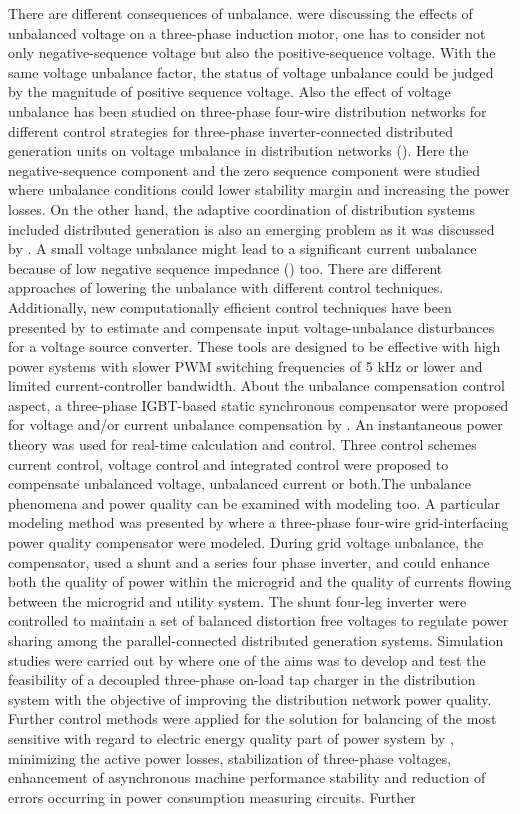    There are different consequences of unbalance. \cite{lee1998effects} were discussing the effects of unbalanced voltage on a three-phase induction motor, one has to consider not only negative-sequence voltage but also the positive-sequence voltage. With the same voltage unbalance factor, the status of voltage unbalance could be judged by the magnitude of positive sequence voltage. Also the effect of voltage unbalance has been studied on three-phase four-wire distribution networks for different control strategies for three-phase inverter-connected distributed generation units on voltage unbalance in distribution networks (\cite{meersman2011three}). Here the negative-sequence component and the zero sequence component were studied where unbalance conditions could lower stability margin and increasing the power losses. On the other hand, the adaptive coordination of distribution systems included distributed generation is also an emerging problem as it was discussed by \cite{ates2016}.  A small voltage unbalance might lead to a significant current unbalance because of low negative sequence impedance (\cite{bina2011three}) too. There are different approaches of lowering the unbalance with different control techniques. Additionally, new computationally efficient control techniques have been presented by \cite{lee2010new} to estimate and compensate input voltage-unbalance disturbances for a voltage source converter. These tools are designed to be effective with high power systems with slower PWM switching frequencies of 5 kHz or lower and limited current-controller bandwidth. About the unbalance compensation control aspect, a three-phase IGBT-based static synchronous compensator were proposed for voltage and/or current unbalance compensation by \cite{xu2010voltage}. An instantaneous power theory was used for real-time calculation and control. Three control schemes current control, voltage control and integrated control were proposed to compensate unbalanced voltage, unbalanced current or both.The unbalance phenomena and power quality can be examined with modeling too. A particular modeling method was presented by \cite{li2005microgrid} where a three-phase four-wire grid-interfacing power quality compensator were modeled. During grid voltage unbalance, the compensator, used a shunt and a series four phase inverter, and could enhance both the quality of power within the microgrid and the quality of currents flowing between the microgrid and utility system. The shunt four-leg inverter were controlled to maintain a set of balanced distortion free voltages to regulate power sharing among the parallel-connected distributed generation systems. Simulation studies were carried out by \cite{Hu2016264} where one of the aims was to develop and test the feasibility of a decoupled three-phase on-load tap charger in the distribution system with the objective of improving the distribution network power quality. Further control methods were applied for the solution for balancing of the most sensitive with regard to electric energy quality part of power system by \cite{uimethod},  minimizing the active power losses, stabilization of three-phase voltages, enhancement of asynchronous machine performance stability and reduction of errors occurring in power consumption measuring circuits. Further 